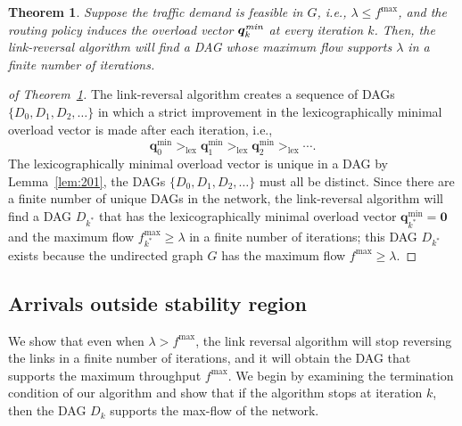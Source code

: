 \documentclass{sig-alternate-2013}
\newtheorem{theorem}{Theorem}
\newcommand{\lex}{\operatorname{lex}}
\begin{document}
\begin{theorem} \label{thm: main}
Suppose the traffic demand is feasible in $G$, i.e., $\lambda\leq f^{\max}$, and the routing policy induces the overload vector $\bm q^{\text{\emph{min}}}_k$ at every iteration $k$. Then, the link-reversal algorithm will find a DAG whose maximum flow supports $\lambda$ in a finite number of iterations.
\end{theorem}
\begin{proof}[of Theorem~\ref{thm: main}]
The link-reversal algorithm creates a sequence of DAGs $\{D_{0}, D_{1}, D_{2}, \ldots\}$ in which a strict improvement in the lexicographically minimal overload vector is made after each iteration, i.e.,
\[
\bm{q}_{0}^{\text{min}} >_{\lex} \bm{q}_{1}^{\text{min}} >_{\lex} \bm{q}_{2}^{\text{min}} >_{\lex} \cdots.
\]
The lexicographically minimal overload vector is unique in a DAG by Lemma~\ref{lem:201}, the DAGs $\{D_{0}, D_{1}, D_{2}, \ldots\}$ must all be distinct. Since there are a finite number of unique DAGs in the network, the link-reversal algorithm will find a DAG $D_{k^{*}}$ that has the lexicographically minimal overload vector $\bm{q}_{k^{*}}^{\text{min}}= \bm{0}$ and the maximum flow $f_{k^{*}}^{\text{max}} \geq \lambda$ in a finite number of iterations; this DAG $D_{k^{*}}$ exists because the undirected graph $G$ has the maximum flow $f^{\max} \geq \lambda$.
\end{proof}

\subsection{Arrivals outside stability region}
We show that even when $\lambda > f^{\max}$, the link reversal algorithm will stop reversing the links in a finite number of iterations, and it will obtain the DAG that supports the maximum throughput $f^{\max}$. We begin by examining the termination condition of our algorithm and show that if the algorithm stops at iteration $k$, then the DAG $D_k$ supports the max-flow of the network. 
\end{document}
